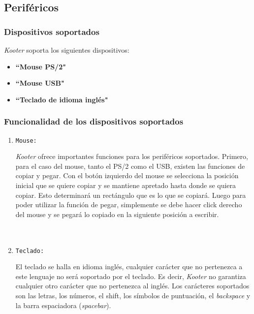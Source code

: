 \documentclass[a4paper,11pt]{article}
\begin{document}
\subsection{Periféricos}
\subsubsection{Dispositivos soportados}
\emph{Kooter} soporta los siguientes dispositivos:
\begin{itemize}
	\item \textbf{``Mouse PS/2"} 
	\item \textbf{``Mouse USB"} 
	\item \textbf{``Teclado de idioma inglés"}
\end{itemize}
\subsubsection{Funcionalidad de los dispositivos soportados}
\begin{enumerate}
	\item \begin{large}\texttt{Mouse:} \end{large}
\emph{Kooter} ofrece importantes funciones para los periféricos soportados. Primero, para el caso del mouse, tanto el PS/2 como el USB, existen las funciones de copiar y pegar. Con el botón izquierdo del mouse se selecciona la posición inicial que se quiere copiar y se mantiene apretado hasta donde se quiera copiar. Esto determinará un rectángulo que es lo que se copiará. Luego para poder utilizar la función de pegar, simplemente se debe hacer click derecho del mouse y se pegará lo copiado en la siguiente posición a escribir.
\\
\\
\\

	\item \begin{large}\texttt{Teclado:} \end{large}
El teclado se halla en idioma inglés, cualquier carácter que no pertenezca a este lenguaje no será soportado por el teclado. Es decir, \emph{Kooter} no garantiza cualquier otro carácter que no pertenezca al inglés. Los carácteres soportados son las letras, los números, el shift, los símbolos de puntuación, el \emph{backspace} y la barra espaciadora (\emph{spacebar}).
\end{enumerate}
\end{document}
